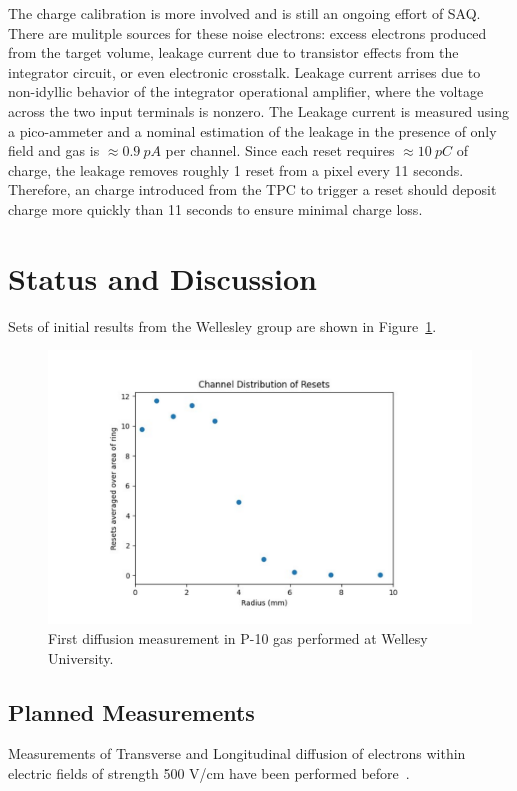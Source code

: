 The charge calibration is more involved and is still an ongoing effort of SAQ.
There are mulitple sources for these noise electrons: excess electrons produced from the target volume, leakage current due to transistor effects from the integrator circuit, or even electronic crosstalk.
Leakage current arrises due to non-idyllic behavior of the integrator operational amplifier, where the voltage across the two input terminals is nonzero.
The Leakage current is measured using a pico-ammeter and a nominal estimation of the leakage in the presence of only field and gas is $\approx 0.9~\unit{pA}$ per channel.
Since each reset requires $\approx 10~\unit{pC}$ of charge, the leakage removes roughly 1 reset from a pixel every 11 seconds.
Therefore, an charge introduced from the TPC to trigger a reset should deposit charge more quickly than 11 seconds to ensure minimal charge loss.



\section{Status and Discussion}


Sets of initial results from the Wellesley group are shown in Figure~\ref{fig:saq_first_diffusion_measurement}.


\begin{figure}[]
\centering
\includegraphics[width=\textwidth]{images/SAQ_first_diffusion_measurement.pdf}
\caption{First diffusion measurement in P-10 gas performed at Wellesy University.}
\label{fig:saq_first_diffusion_measurement}
\end{figure}

\subsection{Planned Measurements}

Measurements of Transverse and Longitudinal diffusion of electrons within electric fields of strength 500 V/cm have been performed before~\citep{lar_diffusion_measurement_LI2016160}.
